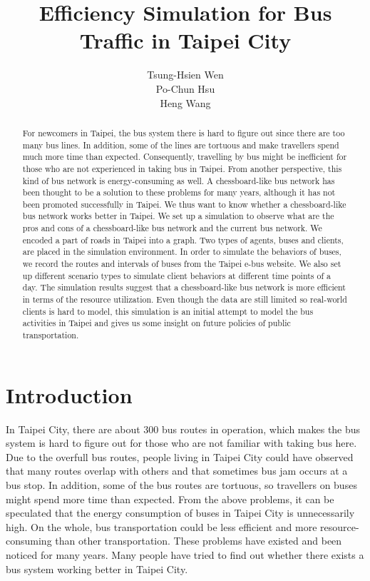 \documentclass{sig-alternate}
\title{Efficiency Simulation for Bus Traffic in Taipei City}
\author{
 \alignauthor
 Tsung-Hsien Wen\\
 	\email{r00921033@ntu.edu.tw}
 \alignauthor
 Po-Chun Hsu\\
 	\email{r00921034@ntu.edu.tw}
 \alignauthor
 Heng Wang\\
 	\email{r00944042@ntu.edu.tw}
 }
\begin{document}
\maketitle

\begin{abstract}
For newcomers in Taipei, the bus system there is hard to figure out since there are too many bus lines.
In addition, some of the lines are tortuous and make travellers spend much more time than expected.
Consequently, travelling by bus might be inefficient for those who are not experienced in taking bus in Taipei.
From another perspective, this kind of bus network is energy-consuming as well.
A chessboard-like bus network has been thought to be a solution to these problems for many years, although it has not been promoted successfully in Taipei.
We thus want to know whether a chessboard-like bus network works better in Taipei.
We set up a simulation to observe what are the pros and cons of a chessboard-like bus network and the current bus network.
We encoded a part of roads in Taipei into a graph.
Two types of agents, buses and clients, are placed in the simulation environment.
In order to simulate the behaviors of buses, we record the routes and intervals of buses from the Taipei e-bus website.
We also set up different scenario types to simulate client behaviors at different time points of a day.
The simulation results suggest that a chessboard-like bus network is more efficient in terms of the resource utilization.
Even though the data are still limited so real-world clients is hard to model, this simulation is an initial attempt to model the bus activities in Taipei and gives us some insight on future policies of public transportation.
\end{abstract}

\section{Introduction}
In Taipei City, there are about 300 bus routes in operation, which makes the bus system is hard to figure out for those who are not familiar with taking bus here.
Due to the overfull bus routes, people living in Taipei City could have observed that many routes overlap with others and that sometimes bus jam occurs at a bus stop.
In addition, some of the bus routes are tortuous, so travellers on buses might spend more time than expected.
From the above problems, it can be speculated that the energy consumption of buses in Taipei City is unnecessarily high.
On the whole, bus transportation could be less efficient and more resource-consuming than other transportation.
These problems have existed and been noticed for many years.
Many people have tried to find out whether there exists a bus system working better in Taipei City.
\end{document}
